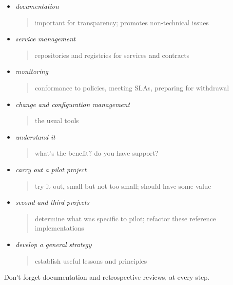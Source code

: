\documentclass{sepslide-soa-faked} %
\begin{document}
\begin{slide}
\begin{itemize}
\item \emph{documentation}
\begin{quote}
important for transparency; promotes non-technical issues
\end{quote}
\item \emph{service management}
\begin{quote}
repositories and registries for services and contracts
\end{quote}
\item \emph{monitoring}
\begin{quote}
conformance to policies, meeting SLAs, preparing for withdrawal
\end{quote}
\item \emph{change and configuration management}
\begin{quote}
the usual tools 
\end{quote}
\end{itemize}
\end{slide}

\begin{slide}
\begin{itemize}
\item \emph{understand it}
\begin{quote}
what's the benefit? do you have support?
\end{quote}
\item \emph{carry out a pilot project}
\begin{quote}
try it out, small but not too small; should have some value
\end{quote}
\item \emph{second and third projects}
\begin{quote}
determine what was specific to pilot; 
refactor these reference implementations
\end{quote}
\item \emph{develop a general strategy}
\begin{quote}
establish useful lessons and principles
\end{quote}
\end{itemize}
Don't forget documentation and retrospective reviews, at every step.
\end{slide}
\end{document}
